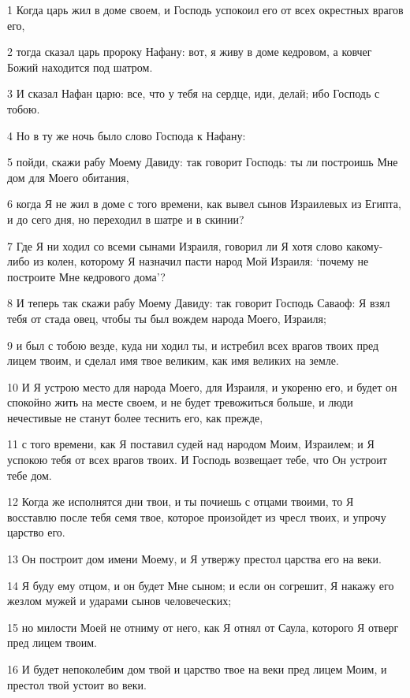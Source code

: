 \par 1 Когда царь жил в доме своем, и Господь успокоил его от всех окрестных врагов его,
\par 2 тогда сказал царь пророку Нафану: вот, я живу в доме кедровом, а ковчег Божий находится под шатром.
\par 3 И сказал Нафан царю: все, что у тебя на сердце, иди, делай; ибо Господь с тобою.
\par 4 Но в ту же ночь было слово Господа к Нафану:
\par 5 пойди, скажи рабу Моему Давиду: так говорит Господь: ты ли построишь Мне дом для Моего обитания,
\par 6 когда Я не жил в доме с того времени, как вывел сынов Израилевых из Египта, и до сего дня, но переходил в шатре и в скинии?
\par 7 Где Я ни ходил со всеми сынами Израиля, говорил ли Я хотя слово какому-либо из колен, которому Я назначил пасти народ Мой Израиля: `почему не построите Мне кедрового дома'?
\par 8 И теперь так скажи рабу Моему Давиду: так говорит Господь Саваоф: Я взял тебя от стада овец, чтобы ты был вождем народа Моего, Израиля;
\par 9 и был с тобою везде, куда ни ходил ты, и истребил всех врагов твоих пред лицем твоим, и сделал имя твое великим, как имя великих на земле.
\par 10 И Я устрою место для народа Моего, для Израиля, и укореню его, и будет он спокойно жить на месте своем, и не будет тревожиться больше, и люди нечестивые не станут более теснить его, как прежде,
\par 11 с того времени, как Я поставил судей над народом Моим, Израилем; и Я успокою тебя от всех врагов твоих. И Господь возвещает тебе, что Он устроит тебе дом.
\par 12 Когда же исполнятся дни твои, и ты почиешь с отцами твоими, то Я восставлю после тебя семя твое, которое произойдет из чресл твоих, и упрочу царство его.
\par 13 Он построит дом имени Моему, и Я утвержу престол царства его на веки.
\par 14 Я буду ему отцом, и он будет Мне сыном; и если он согрешит, Я накажу его жезлом мужей и ударами сынов человеческих;
\par 15 но милости Моей не отниму от него, как Я отнял от Саула, которого Я отверг пред лицем твоим.
\par 16 И будет непоколебим дом твой и царство твое на веки пред лицем Моим, и престол твой устоит во веки.
